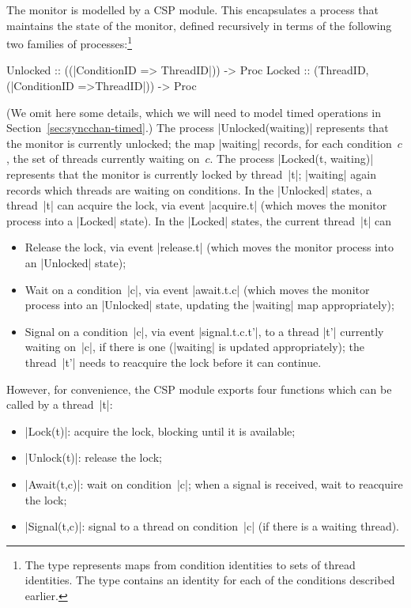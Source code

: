 
The monitor is modelled by a CSP module.  This encapsulates a process that
maintains the state of the monitor, defined recursively in terms of the
following two families of processes:\footnote{%
%
The type  represents maps from condition
identities to sets of thread identities.  The type  contains
an identity for each of the conditions described earlier.}
%
\begin{cspm}
Unlocked :: ((|ConditionID => {ThreadID}|)) -> Proc 
Locked :: (ThreadID, (|ConditionID =>{ThreadID}|)) -> Proc 
\end{cspm}
%
(We omit here some details, which we will need to model timed operations in
Section~\ref{sec:syncchan-timed}.)  The process |Unlocked(waiting)| represents
that the monitor is currently unlocked; the map |waiting| records, for each
condition~$c$, the set of threads currently waiting on~$c$.  The process
|Locked(t, waiting)| represents that the monitor is currently locked by
thread~|t|; |waiting| again records which threads are waiting on conditions.
In the |Unlocked| states, a thread~|t| can acquire the lock, via event
|acquire.t| (which moves the monitor process into a |Locked| state).  In the
|Locked| states, the current thread~|t| can
\begin{itemize}
\item Release the lock, via event |release.t| (which moves the monitor process
  into an |Unlocked| state);
\item Wait on a condition~|c|, via event |await.t.c| (which moves the monitor
  process into an |Unlocked| state, updating the |waiting| map appropriately);
\item Signal on a condition~|c|, via event |signal.t.c.t'|, to a thread |t'|
  currently waiting on~|c|, if there is one (|waiting| is updated
  appropriately); the thread~|t'| needs to reacquire the lock before it can
  continue.
\end{itemize}
%
However, for convenience, the CSP module exports four functions which can be
called by a thread~|t|:
%
\begin{itemize}
\item |Lock(t)|: acquire the lock, blocking until it is available;
\item |Unlock(t)|: release the lock;
\item |Await(t,c)|: wait on condition~|c|; when a signal is received, wait to
  reacquire the lock;
\item |Signal(t,c)|: signal to a thread on condition~|c| (if there is a
  waiting thread). 
\end{itemize}

